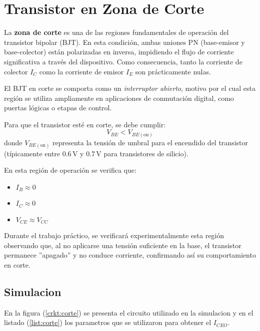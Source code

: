 \chapter{Transistor en Zona de Corte}
  La \textbf{zona de corte} es una de las regiones fundamentales de operación del transistor bipolar (BJT). En esta
  condición, ambas uniones PN (base-emisor y base-colector) están polarizadas en inversa, impidiendo el flujo de
  corriente significativa a través del dispositivo. Como consecuencia, tanto la corriente de colector $I_C$ como la
  corriente de emisor $I_E$ son prácticamente nulas.

  El BJT en corte se comporta como un \textit{interruptor abierto}, motivo por el cual esta región se utiliza
  ampliamente en aplicaciones de conmutación digital, como puertas lógicas o etapas de control.

  Para que el transistor esté en corte, se debe cumplir:
  \begin{equation}
  V_{BE} < V_{BE(\text{on})}
  \end{equation}
  donde $V_{BE(\text{on})}$ representa la tensión de umbral para el encendido del transistor (típicamente entre 0.6\,V y
  0.7\,V para transistores de silicio).

  En esta región de operación se verifica que:
  \begin{itemize}
    \item $I_B \approx 0$
    \item $I_C \approx 0$
    \item $V_{CE} \approx V_{CC}$
  \end{itemize}

  Durante el trabajo práctico, se verificará experimentalmente esta región observando que, al no aplicarse una tensión
  suficiente en la base, el transistor permanece ''apagado'' y no conduce corriente, confirmando así su comportamiento
  en corte.

  \section{Simulacion}
    En la figura (\ref{crkt:corte}) se presenta el circuito utilizado en la simulacion y en el listado
    (\ref{list:corte}) los parametros que se utilizaron para obtener el $I_{CEO}$.


